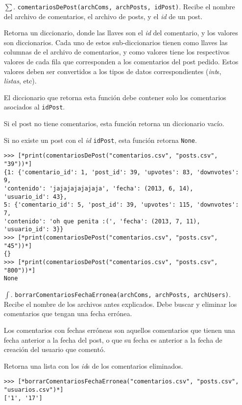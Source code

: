\begin{enumerate}

    \item[$\sum$. ] \texttt{comentariosDePost(archComs, archPosts, idPost)}. Recibe el nombre del archivo de comentarios, el archivo de posts, y el \textit{id} de un post. 

    Retorna un diccionario, donde las llaves son el \textit{id} del comentario, y los valores son diccionarios. Cada uno de estos sub-diccionarios tienen como llaves las columnas de el archivo de comentarios, y como valores tiene los respectivos valores de cada fila que corresponden a los comentarios del post pedido. Estos valores deben ser convertidos a los tipos de datos correspondientes (\textit{int}s, \textit{listas}, etc).

    El diccionario que retorna esta función debe contener solo los comentarios asociados al \texttt{idPost}.

    Si el post no tiene comentarios, esta función retorna un diccionario vacío.
    
    Si no existe un post con el \textit{id} \texttt{idPost}, esta función retorna \texttt{None}.

    \begin{lstlisting}[style=consola]
>>> [*print(comentariosDePost("comentarios.csv", "posts.csv", "39"))*]
{1: {'comentario_id': 1, 'post_id': 39, 'upvotes': 83, 'downvotes': 9, 
'contenido': 'jajajajajajaja', 'fecha': (2013, 6, 14), 'usuario_id': 43}, 
5: {'comentario_id': 5, 'post_id': 39, 'upvotes': 115, 'downvotes': 7, 
'contenido': 'oh que penita :(', 'fecha': (2013, 7, 11), 'usuario_id': 3}}
>>> [*print(comentariosDePost("comentarios.csv", "posts.csv", "45"))*]
{}
>>> [*print(comentariosDePost("comentarios.csv", "posts.csv", "800"))*]
None
    \end{lstlisting}

    \item [$\int$. ] \texttt{borrarComentariosFechaErronea(archComs, archPosts, archUsers)}. Recibe el nombre de los archivos antes explicados. Debe buscar y eliminar los comentarios que tengan una fecha errónea.
    
    Los comentarios con fechas erróneas son aquellos comentarios que tienen una fecha anterior a la fecha del post, o que su fecha es anterior a la fecha de creación del usuario que comentó.

    Retorna una lista con los \textit{id}s de los comentarios eliminados.

    \begin{lstlisting}[style=consola]
>>> [*borrarComentariosFechaErronea("comentarios.csv", "posts.csv", 
"usuarios.csv")*]
['1', '17']
    \end{lstlisting}

\end{enumerate}

